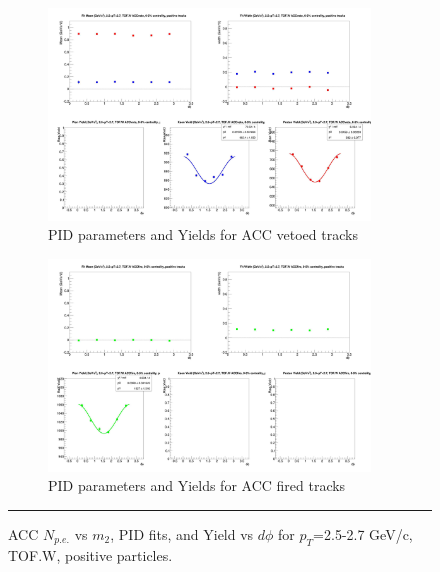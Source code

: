 \begin{figure}[H]
  \ContinuedFloat
    \begin{subfigure}{1\textwidth}
   \centering
   \includegraphics[width=0.94\textwidth]{hiptfits/pos/fitParams_tof2_cent0_ch1_pT-25-27.jpg}
    \caption{PID parameters and Yields for ACC vetoed tracks}
    \end{subfigure}    
    \begin{subfigure}{1\textwidth}
   \centering
   \includegraphics[width=0.94\textwidth]{hiptfits/pos/fitParams_tof3_cent0_ch1_pT-25-27.jpg}
    \caption{PID parameters and Yields for ACC fired tracks}
    \end{subfigure} 
    \rule{35em}{0.5pt}
  \caption[ACC $N_{p.e.}$ vs $m_2$, PID fits, and Yield vs $d\phi$ for $p_T$=2.5-2.7 GeV/c, TOF.W, negative particles.]{ACC $N_{p.e.}$ vs $m_2$, PID fits, and Yield vs $d\phi$ for $p_T$=2.5-2.7 GeV/c, TOF.W, positive particles.}
  \label{fig:acc25-27pos}
\end{figure}

